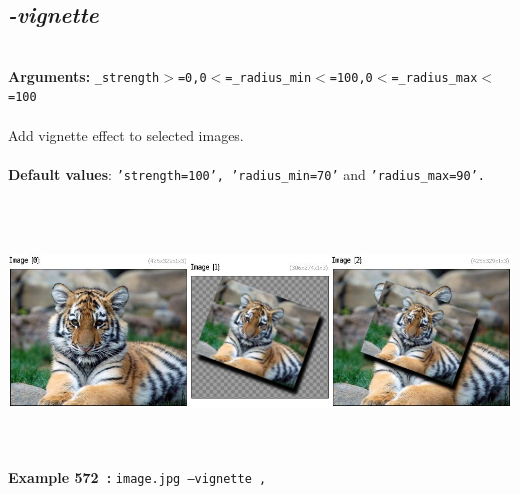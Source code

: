 \documentclass[a4paper,11pt,twoside]{book}
\begin{document}
\subsection{\emph{-vignette} }\vspace*{-0.5em}
~\\\textbf{Arguments: } 
{\small \texttt{\_strength$>$=0,0$<$=\_radius\_min$<$=100,0$<$=\_radius\_max$<$=100}}\\~\\
Add vignette effect to selected images.
~\\~\\\textbf{Default values}: {\small \texttt{'strength=100', 'radius\_min=70'} and \texttt{'radius\_max=90'.}}
\begin{center}\includegraphics[keepaspectratio=true,height=7cm,width=\textwidth]{img/gmic_def572.jpg}\\
{\footnotesize \textbf{Example 572~:} \texttt{image.jpg --vignette ,}}
\end{center}
\end{document}
